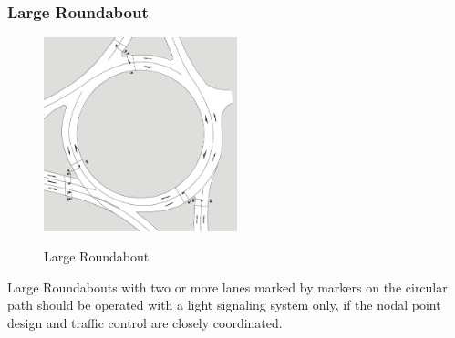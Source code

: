 \subsubsection{Large Roundabout}


\begin{figure}[!ht]
\caption{Large Roundabout \cite{man06}}
\includegraphics[width=0.5\textwidth]{bilder/large_roundabout.png} %
\label{roundabout_large}
\end{figure}

Large Roundabouts with two or more lanes marked by markers on the circular path should be operated with a light signaling system only,
if the nodal point design and traffic control are closely coordinated.


